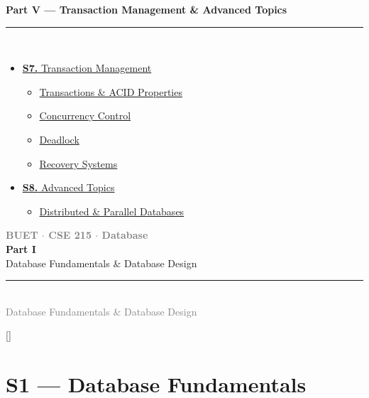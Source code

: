 \documentclass[12pt,a3paper]{article}
\newcommand{\secdivider}[4]{%
  \newpage\thispagestyle{empty}%
  \vspace*{\fill}%
  \begin{tcolorbox}[enhanced,colback=#4!7,colframe=#3,boxrule=1.5pt,arc=8pt,
    left=20pt,right=20pt,top=22pt,bottom=22pt,
    shadow={3pt}{-3pt}{0pt}{black!15}]
    \centering
    {\large\textcolor{gray}{\textbf{BUET $\cdot$ CSE 215 $\cdot$ Database}}}\\[8pt]
    {\fontsize{26}{32}\selectfont\bfseries\textcolor{#3}{#1}}\\[6pt]
    {\fontsize{15}{19}\selectfont\textcolor{dgray}{#2}}\\[12pt]
    \textcolor{#3!60}{\rule{0.5\textwidth}{0.5pt}}\\[6pt]
    {\small\textcolor{gray}{#2}}
  \end{tcolorbox}%
  \vspace*{\fill}\newpage%
}
\begin{document}
\begin{tcolorbox}[breakable,colback=cE!5,colframe=cE,boxrule=1pt,arc=5pt,
  left=8pt,right=8pt,top=8pt,bottom=8pt,before skip=4pt]
  {\large\bfseries\textcolor{cE}{Part V --- Transaction Management \& Advanced Topics}}\\[5pt]
  \textcolor{cE!40}{\rule{\textwidth}{0.4pt}}\\[3pt]
  \small\begin{itemize}[leftmargin=1.2em,itemsep=1pt,label={\textcolor{cE}{$\triangleright$}}]
    \item \hyperref[sec:S7]{\textbf{S7.} Transaction Management}
      \begin{itemize}[leftmargin=1.5em,itemsep=0pt,label={\textcolor{cE}{$\cdot$}}]
        \item \hyperref[sub:s7-acid]{Transactions \& ACID Properties}
        \item \hyperref[sub:s7-cc]{Concurrency Control}
        \item \hyperref[sub:s7-deadlock]{Deadlock}
        \item \hyperref[sub:s7-recovery]{Recovery Systems}
      \end{itemize}
    \item \hyperref[sec:S8]{\textbf{S8.} Advanced Topics}
      \begin{itemize}[leftmargin=1.5em,itemsep=0pt,label={\textcolor{cE}{$\cdot$}}]
        \item \hyperref[sub:s8-dist]{Distributed \& Parallel Databases}
      \end{itemize}
  \end{itemize}
\end{tcolorbox}

\newpage

\secdivider{Part I}{Database Fundamentals \& Database Design}{cA}{cA}
\titleformat{\section}{\large\bfseries\color{cA}}{}{0em}{}[\titlerule]

\section{S1 --- Database Fundamentals}
\label{sec:S1}
\end{document}
